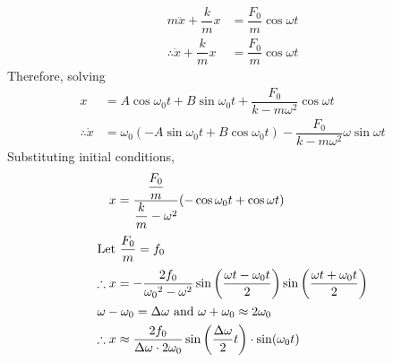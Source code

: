 \documentclass[fleqn, a5paper]{amsart}
\theoremstyle{definition}
\theoremstyle{theorem}
\begin{document}
\begin{align*}
	m \ddot{x} + \dfrac{k}{m} x &= \dfrac{F_0}{m} \cos \omega t\\
	\therefore \ddot{x} + \dfrac{k}{m} x &= \dfrac{F_0}{m} \cos \omega t
\end{align*}
Therefore, solving
\begin{align*}
	x &= A \cos \omega_0 t + B \sin \omega_0 t + \dfrac{F_0}{k - m \omega^2} \cos \omega t\\
	\therefore \dot{x} &= \omega_0 (-A \sin \omega_0 t + B \cos \omega_0 t) - \dfrac{F_0}{k - m \omega^2} \omega \sin \omega t
\end{align*}
Substituting initial conditions,
\begin{align*}
	x &= \dfrac{\dfrac{F_0}{m}}{\dfrac{k}{m} - \omega^2} (-\cos \omega_0 t + \cos \omega t)\\
	\intertext{Let $\dfrac{F_0}{m} = f_0$}
	\therefore x &= -\dfrac{2 f_0}{{\omega_0}^2 - \omega^2} \sin \left( \dfrac{\omega t - \omega_0 t}{2} \right) \sin \left( \dfrac{\omega t + \omega_0 t}{2} \right)\\
	\intertext{$\omega - \omega_0 = \Delta \omega$ and $\omega + \omega_0 \approx 2 \omega_0$}
	\therefore x &\approx \dfrac{2 f_0}{\Delta \omega \cdot 2 \omega_0} \sin \left( \dfrac{\Delta \omega}{2} t \right) \cdot \sin (\omega_0 t)
\end{align*}
\end{document}
